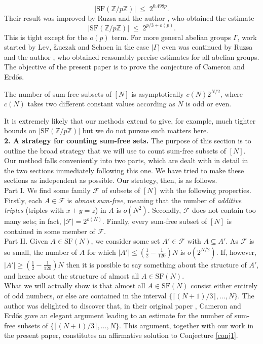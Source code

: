 \documentclass[a4paper,12pt]{article}
\begin{document}
\[ |\mbox{SF}(\mathbb{Z}/p\mathbb{Z})| \; \leq \; 2^{0.498p}.\]
Their result was improved by Ruzsa and the author \cite{GreenRuz1}, who obtained the estimate
\[ |\mbox{SF}(\mathbb{Z}/p\mathbb{Z})| \; \leq \; 2^{p/3 + o(p)}.\] This is tight except for the $o(p)$ term. For more general abelian groups $\Gamma$, work started by Lev, {\L}uczak and Schoen \cite{LLS} in the case $|\Gamma|$ even was continued by Ruzsa and the author \cite{GreenRuz2}, who obtained reasonably precise estimates for all abelian groups.\\[11pt]
The objective of the present paper is to prove the conjecture of Cameron and Erd\H{o}s. 
\begin{theoremenv}\label{mainthm}
The number of sum-free subsets of $[N]$ is asymptotically $c(N)2^{N/2}$, where $c(N)$ takes two different constant values according as $N$ is odd or even.
\end{theoremenv}
It is extremely likely that our methods extend to give, for example, much tighter bounds on $|\mbox{SF}(\mathbb{Z}/p\mathbb{Z})|$ but we do not pursue such matters here.\\[11pt]
\noindent\textbf{2. A strategy for counting sum-free sets.}
The purpose of this section is to outline the broad strategy that we will use to count sum-free subsets of $[N]$. Our method falls conveniently into two parts, which are dealt with in detail in the two sections immediately following this one. We have tried to make these sections as independent as possible. Our strategy, then, is as follows.\\[11pt]
Part I. We find some family $\mathcal{F}$ of subsets of $[N]$ with the following properties. Firstly, each $A \in \mathcal{F}$ is \textit{almost sum-free}, meaning that the number of \textit{additive triples} (triples with $x + y = z$) in $A$ is $o(N^2)$. Secondly, $\mathcal{F}$ does not contain too many sets; in fact, $|\mathcal{F}| = 2^{o(N)}$. Finally, every sum-free subset of $[N]$ is contained in some member of $\mathcal{F}$. \\[11pt]
Part II. Given $A \in \mbox{SF}(N)$, we consider some set $A' \in \mathcal{F}$ with $A \subseteq A'$. As $\mathcal{F}$ is so small, the number of $A$ for which $|A'| \leq \left(\frac{1}{2} - \frac{1}{120}\right)N$ is $o(2^{N/2})$. If, however, $|A'| \geq \left(\frac{1}{2} - \frac{1}{120}\right)N$ then it is possible to say something about the structure of $A'$, and hence about the structure of almost all $A \in \mbox{SF}(N)$.\\[11pt]
What we will actually show is that almost all $A \in \mbox{SF}(N)$ consist either entirely of odd numbers, or else are contained in the interval $\{\lceil (N + 1)/3\rceil,\dots,N\}$. The author was delighted to discover that, in their original paper \cite{CE1}, Cameron and Erd\H{o}s gave an elegant argument leading to an estimate for the number of sum-free subsets of $\{\lceil (N + 1)/3\rceil,\dots,N\}$. This argument, together with our work in the present paper, constitutes an affirmative solution to Conjecture \ref{conj1}.\\[11pt]
\end{document}
